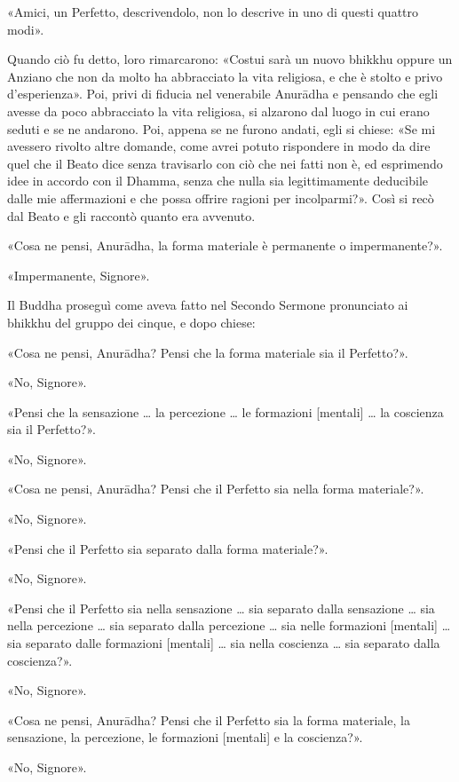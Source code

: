 «Amici, un Perfetto, descrivendolo, non lo descrive in uno di questi quattro
modi».

Quando ciò fu detto, loro rimarcarono: «Costui sarà un nuovo bhikkhu oppure un
Anziano che non da molto ha abbracciato la vita religiosa, e che è stolto e
privo d’esperienza». Poi, privi di fiducia nel venerabile Anurādha e pensando
che egli avesse da poco abbracciato la vita religiosa, si alzarono dal luogo in
cui erano seduti e se ne andarono. Poi, appena se ne furono andati, egli si
chiese: «Se mi avessero rivolto altre domande, come avrei potuto rispondere in
modo da dire quel che il Beato dice senza travisarlo con ciò che nei fatti non
è, ed esprimendo idee in accordo con il Dhamma, senza che nulla sia
legittimamente deducibile dalle mie affermazioni e che possa offrire ragioni per
incolparmi?». Così si recò dal Beato e gli raccontò quanto era avvenuto.

«Cosa ne pensi, Anurādha, la forma materiale è permanente o impermanente?».

«Impermanente, Signore».

 Il Buddha proseguì come aveva fatto nel Secondo
Sermone pronunciato ai bhikkhu del gruppo dei cinque, e dopo chiese:

«Cosa ne pensi, Anurādha? Pensi che la forma materiale sia il Perfetto?».

«No, Signore».

«Pensi che la sensazione … la percezione … le formazioni [mentali] … la
coscienza sia il Perfetto?».

«No, Signore».

«Cosa ne pensi, Anurādha? Pensi che il Perfetto sia nella forma materiale?».

«No, Signore».

«Pensi che il Perfetto sia separato dalla forma materiale?».

«No, Signore».

«Pensi che il Perfetto sia nella sensazione … sia separato dalla sensazione …
sia nella percezione … sia separato dalla percezione … sia nelle formazioni
[mentali] … sia separato dalle formazioni [mentali] … sia nella coscienza … sia
separato dalla coscienza?».

«No, Signore».

«Cosa ne pensi, Anurādha? Pensi che il Perfetto sia la forma materiale, la
sensazione, la percezione, le formazioni [mentali] e la coscienza?».

«No, Signore».

